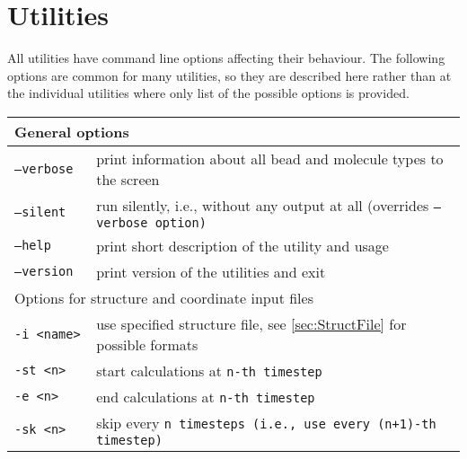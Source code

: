 \chapter{Utilities} \label{chap:Utils}

All utilities have command line options affecting their behaviour. The following
options are common for many utilities, so they are described here rather than at
the individual utilities where only list of the possible options is
provided.\\[1em]
\noindent
\begin{tabular}{p{}p{}}
  \toprule
  \multicolumn{2}{l}{General options}\\
  \midrule
  \tt{--verbose} & print information about all bead and molecule types to the
                   screen\\
  \tt{--silent}  & run silently, i.e., without any output at all (overrides
                   \tt{--verbose} option)\\
  \tt{--help}    & print short description of the utility and usage\\
  \tt{--version} & print version of the utilities and exit\\
  \midrule
  \multicolumn{2}{l}{Options for structure and coordinate input files}\\
  \midrule
  \tt{-i <name>}  & use specified structure file, see
    \cref{sec:StructFile} for possible formats\\
  \tt{-st <n>}    & start calculations at \tt{n}-th
                    timestep\\
  \tt{-e <n>}     & end calculations at \tt{n}-th
                    timestep\\
  \tt{-sk <n>}    & skip every \tt{n} timesteps (i.e., use every \tt{(n+1)}-th
                    timestep)\\
  \bottomrule
\end{tabular}\\[1em]



